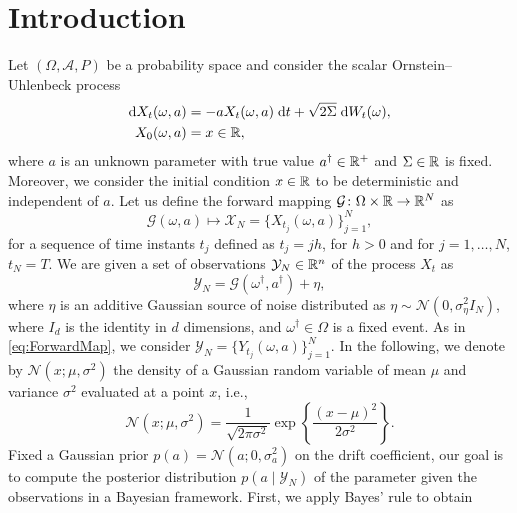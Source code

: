 \documentclass[10pt]{article}
\begin{document}
\maketitle	

\section{Introduction}
Let $(\Omega, \mathcal A, P)$ be a probability space and consider the scalar Ornstein--Uhlenbeck process
\begin{equation}\label{eq:OU}
\begin{aligned}
	\mathrm{d} X_t(\omega, a) &= -a X_t(\omega, a) \; \mathrm{d} t + \sqrt{2\Sigma} \; \mathrm{d} W_t(\omega),\\
	X_0(\omega, a) &= x \in \mathbb{R},
\end{aligned}
\end{equation}
where $a$ is an unknown parameter with true value $a^\dagger \in \mathbb{R}^+$ and $\Sigma \in \mathbb{R}$ is fixed. Moreover, we consider the initial condition $x\in\mathbb{R}$ to be deterministic and independent of $a$. Let us define the forward mapping $\mathcal G\colon \Omega \times \mathbb{R} \to \mathbb{R}^N$ as
\begin{equation}\label{eq:ForwardMap}
	\mathcal G(\omega, a) \mapsto \mathcal X_N = \{X_{t_j}(\omega, a)\}_{j=1}^N,
\end{equation}
for a sequence of time instants $t_j$ defined as $t_j = jh$, for $h > 0$ and for $j = 1, \ldots, N$, $t_N = T$. We are given a set of observations $\mathcal Y_N \in \mathbb{R}^n$ of the process $X_t$ as
\begin{equation}\label{eq:Observations}
	\mathcal Y_N = \mathcal G(\omega^\dagger, a^\dagger) + \eta,
\end{equation}
where $\eta$ is an additive Gaussian source of noise distributed as $\eta \sim \mathcal N(0, \sigma^2_\eta I_N)$, where $I_d$ is the identity in $d$ dimensions, and $\omega^\dagger \in \Omega$ is a fixed event. As in \eqref{eq:ForwardMap}, we consider $\mathcal Y_N = \{Y_{t_j}(\omega, a)\}_{j=1}^N$. In the following, we denote by $\mathcal N(x; \mu, \sigma^2)$ the density of a Gaussian random variable of mean $\mu$ and variance $\sigma^2$ evaluated at a point $x$, i.e.,
\begin{equation}
	\mathcal N(x; \mu, \sigma^2) = \frac{1}{\sqrt{2\pi\sigma^2}} \exp\left\{ \frac{(x - \mu)^2}{2\sigma^2} \right\}.
\end{equation}
Fixed a Gaussian prior $p(a) = \mathcal N(a; 0, \sigma^2_a)$ on the drift coefficient, our goal is to compute the posterior distribution $p(a \mid \mathcal Y_N)$ of the parameter given the observations in a Bayesian framework. First, we apply Bayes' rule to obtain
\end{document}
